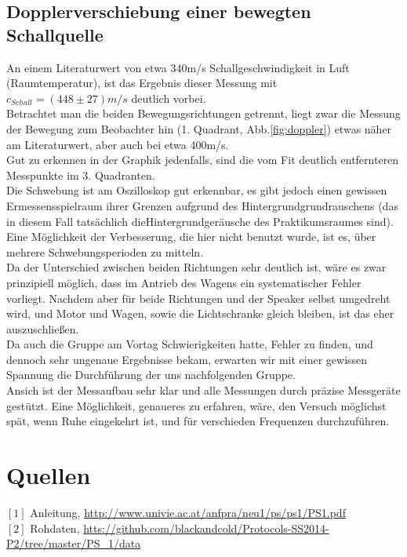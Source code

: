 \documentclass[12pt,a4paper]{article}
\begin{document}
\begin{multicols}{2}
\subsection{Dopplerverschiebung einer bewegten Schallquelle}
An einem Literaturwert von etwa 340m/s Schallgeschwindigkeit in Luft (Raumtemperatur), ist das Ergebnis dieser Messung mit $c_{Schall} = (448 \pm 27) m/s$ deutlich vorbei.\\
Betrachtet man die beiden Bewegungsrichtungen getrennt, liegt zwar die Messung der Bewegung zum Beobachter hin (1. Quadrant, Abb.\ref{fig:doppler}) etwas näher am Literaturwert, aber auch bei etwa 400m/s.\\
Gut zu erkennen in der Graphik jedenfalls, sind die vom Fit deutlich entfernteren Messpunkte im 3. Quadranten.\\
Die Schwebung ist am Oszilloskop gut erkennbar, es gibt jedoch einen gewissen Ermessensspielraum ihrer Grenzen aufgrund des Hintergrundgrundrauschens (das in diesem Fall tatsächlich dieHintergrundgeräusche des Praktikumsraumes sind).\\
Eine Möglichkeit der Verbesserung, die hier nicht benutzt wurde, ist es, über mehrere Schwebungsperioden zu mitteln.\\

Da der Unterschied zwischen beiden Richtungen sehr deutlich ist, wäre es zwar prinzipiell möglich, dass im Antrieb des Wagens ein systematischer Fehler vorliegt. Nachdem aber für beide Richtungen und der Speaker selbst umgedreht wird, und Motor und Wagen, sowie die Lichtschranke gleich bleiben, ist das eher auszuschließen.\\

Da auch die Gruppe am Vortag Schwierigkeiten hatte, Fehler zu finden, und dennoch sehr ungenaue Ergebnisse bekam, erwarten wir mit einer gewissen Spannung die Durchführung der uns nachfolgenden Gruppe.\\

Ansich ist der Messaufbau sehr klar und alle Messungen durch präzise Messgeräte gestützt. Eine Möglichkeit, genaueres zu erfahren, wäre, den Versuch möglichst spät, wenn Ruhe eingekehrt ist, und für verschieden Frequenzen durchzuführen.


\section{Quellen}
$[1]$ Anleitung, \url{http://www.univie.ac.at/anfpra/neu1/ps/ps1/PS1.pdf}\\
$[2]$ Rohdaten, \url{htts://github.com/blackandcold/Protocols-SS2014-P2/tree/master/PS_1/data}\\

\end{multicols}
\end{document}
